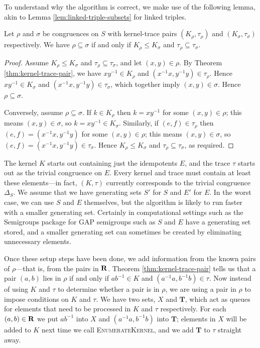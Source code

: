 To understand why the algorithm is correct, we make use of the following lemma,
akin to Lemma \ref{lem:linked-triple-subsets} for linked triples.

\begin{lemma}
  \label{lem:kertr-subsets}
  Let $\rho$ and $\sigma$ be congruences on $S$ with kernel-trace pairs
  $(K_\rho, \tau_\rho)$ and $(K_\sigma, \tau_\sigma)$ respectively.  We have
  $\rho \subseteq \sigma$ if and only if $K_\rho \leq K_\sigma$ and
  $\tau_\rho \subseteq \tau_\sigma$.
  \begin{proof}
    Assume $K_\rho \leq K_\sigma$ and $\tau_\rho \subseteq \tau_\sigma$, and let
    $(x,y) \in \rho$.  By Theorem \ref{thm:kernel-trace-pair}, we have
    $xy^{-1} \in K_\rho$ and $(x^{-1}x, y^{-1}y) \in \tau_\rho$.  Hence
    $xy^{-1} \in K_\sigma$ and $(x^{-1}x, y^{-1}y) \in \tau_\sigma$, which
    together imply $(x,y) \in \sigma$.  Hence $\rho \subseteq \sigma$.

    Conversely, assume $\rho \subseteq \sigma$.  If $k \in K_\rho$ then
    $k=xy^{-1}$ for some $(x,y) \in \rho$; this means $(x,y) \in \sigma$, so
    $k=xy^{-1} \in K_\sigma$.  Similarly, if $(e,f) \in \tau_\rho$ then
    $(e,f) = (x^{-1}x, y^{-1}y)$ for some $(x,y) \in \rho$; this means
    $(x,y) \in \sigma$, so $(e,f) = (x^{-1}x, y^{-1}y) \in \tau_\sigma$.  Hence
    $K_\rho \leq K_\sigma$ and $\tau_\rho \subseteq \tau_\sigma$, as
    required.
  \end{proof}
\end{lemma}

The kernel $K$ starts out containing just the idempotents $E$, and the trace
$\tau$ starts out as the trivial congruence on $E$.  Every kernel and trace must
contain at least these elements---in fact, $(K, \tau)$ currently corresponds to
the trivial congruence $\Delta_S$.  We assume that we have generating sets $S'$
for $S$ and $E'$ for $E$.  In the worst case, we can use $S$ and $E$ themselves,
but the algorithm is likely to run faster with a smaller generating set.
Certainly in computational settings such as the Semigroups package for GAP
\cite{semigroups} semigroups such as $S$ and $E$ have a generating set stored,
and a smaller generating set can sometimes be created by eliminating unnecessary
elements.

Once these setup steps have been done, we add information from the known pairs
of $\rho$---that is, from the pairs in $\mathbf{R}$.  Theorem
\ref{thm:kernel-trace-pair} tells us that a pair $(a,b)$ lies in $\rho$ if and
only if $ab^{-1} \in K$ and $(a^{-1}a, b^{-1}b) \in \tau$.  Now instead of using
$K$ and $\tau$ to determine whether a pair is in $\rho$, we are using a pair in
$\rho$ to impose conditions on $K$ and $\tau$.  We have two sets, $X$ and
$\mathbf{T}$, which act as queues for elements that need to be processed in $K$
and $\tau$ respectively.  For each $(a,b) \in \mathbf{R}$ we put $ab^{-1}$ into
$X$ and $(a^{-1}a, b^{-1}b)$ into $\mathbf{T}$; elements in $X$ will be added
to $K$ next time we call \textsc{EnumerateKernel}, and we add $\mathbf{T}$ to
$\tau$ straight away.

